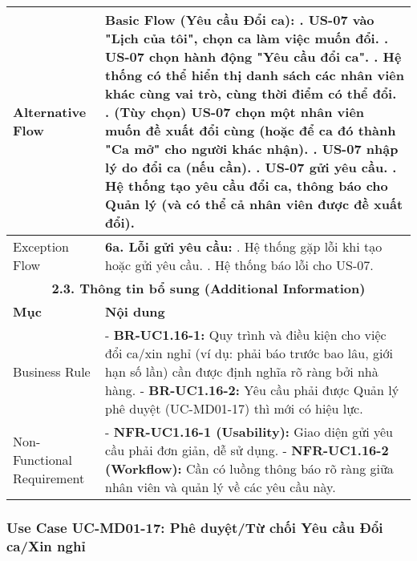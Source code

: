 \begin{longtable}{|m{4cm}|p{11cm}|}
\hline
Alternative Flow & \textbf{Basic Flow (Yêu cầu Đổi ca):} \newline    1. US-07 vào "Lịch của tôi", chọn ca làm việc muốn đổi. \newline    2. US-07 chọn hành động "Yêu cầu đổi ca". \newline    3. Hệ thống có thể hiển thị danh sách các nhân viên khác cùng vai trò, cùng thời điểm có thể đổi. \newline    4. (Tùy chọn) US-07 chọn một nhân viên muốn đề xuất đổi cùng (hoặc để ca đó thành "Ca mở" cho người khác nhận). \newline    5. US-07 nhập lý do đổi ca (nếu cần). \newline    6. US-07 gửi yêu cầu. \newline    7. Hệ thống tạo yêu cầu đổi ca, thông báo cho Quản lý (và có thể cả nhân viên được đề xuất đổi). \\
\hline
Exception Flow & \textbf{6a. Lỗi gửi yêu cầu:} \newline    1. Hệ thống gặp lỗi khi tạo hoặc gửi yêu cầu. \newline    2. Hệ thống báo lỗi cho US-07. \\
\hline
\multicolumn{2}{|c|}{\textbf{2.3. Thông tin bổ sung (Additional Information)}} \\
\hline
\textbf{Mục} & \textbf{Nội dung} \\
\hline
Business Rule & - \textbf{BR-UC1.16-1:} Quy trình và điều kiện cho việc đổi ca/xin nghỉ (ví dụ: phải báo trước bao lâu, giới hạn số lần) cần được định nghĩa rõ ràng bởi nhà hàng. \newline - \textbf{BR-UC1.16-2:} Yêu cầu phải được Quản lý phê duyệt (UC-MD01-17) thì mới có hiệu lực. \\
\hline
Non-Functional Requirement & - \textbf{NFR-UC1.16-1 (Usability):} Giao diện gửi yêu cầu phải đơn giản, dễ sử dụng. \newline - \textbf{NFR-UC1.16-2 (Workflow):} Cần có luồng thông báo rõ ràng giữa nhân viên và quản lý về các yêu cầu này. \\
\hline
\end{longtable}

\subsubsection{Use Case UC-MD01-17: Phê duyệt/Từ chối Yêu cầu Đổi ca/Xin nghỉ}

